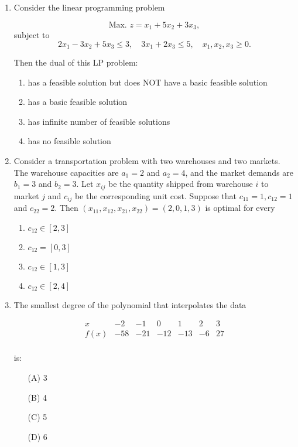 \documentclass[journal]{IEEEtran}
\numberwithin{figure}{enumi}
\begin{document}
\begin{enumerate}
\item Consider the linear programming problem

\begin{equation}
\text{Max. } z = x_1 + 5x_2 + 3x_3,
\end{equation}
subject to
\begin{equation}
2x_1 - 3x_2 + 5x_3 \leq 3, \quad 3x_1 + 2x_3 \leq 5, \quad x_1, x_2, x_3 \geq 0.
\end{equation}

Then the dual of this LP problem:

\begin{enumerate}
    \item has a feasible solution but does NOT have a basic feasible solution
    \item has a basic feasible solution
    \item has infinite number of feasible solutions
    \item has no feasible solution
\end{enumerate}

\item Consider a transportation problem with two warehouses and two markets. The warehouse capacities are $a_1 = 2$ and $a_2 = 4$, and the market demands are $b_1 = 3$ and $b_2 = 3$. Let $x_{ij}$ be the quantity shipped from warehouse $i$ to market $j$ and $c_{ij}$ be the corresponding unit cost. Suppose that $c_{11} = 1, c_{12} = 1$ and $c_{22} = 2$. Then $(x_{11}, x_{12}, x_{21}, x_{22}) = (2, 0, 1, 3)$ is optimal for every

\begin{enumerate}
    \item $c_{12} \in [2, 3]$
    \item $c_{12} = [0, 3]$
    \item $c_{12} \in [1, 3]$
    \item $c_{12} \in [2, 4]$
\end{enumerate}
\item The smallest degree of the polynomial that interpolates the data

\[
\begin{array}{c|cccccc}
x & -2 & -1 & 0 & 1 & 2 & 3 \\
\hline
f(x) & -58 & -21 & -12 & -13 & -6 & 27 \\
\end{array}
\]

is:

\begin{enumerate}
    \item[(A)] 3
    \item[(B)] 4
    \item[(C)] 5
    \item[(D)] 6
\end{enumerate}


\end{enumerate}
\end{document}
